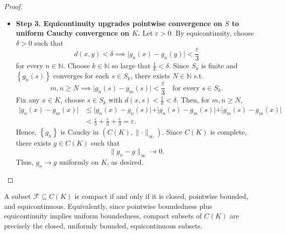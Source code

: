 \begin{proof}
\begin{itemize}
        \item \textbf{Step 3. Equicontinuity upgrades pointwise convergence on \(S\) to uniform Cauchy convergence on \(K\).} Let \(\varepsilon > 0\). By equicontinuity, choose \(\delta > 0\) such that 
        \[
            d(x, y) < \delta \implies \vert g_n(x) - g_n(y) \vert < \frac{\varepsilon}{3} 
        \]
        for every \(n \in \mathbb{N}\). Choose \(k \in \mathbb{N}\) so large that \(\frac{1}{k} < \delta\). Since \(S_k\) is finite and \(\left\{ g_n(s) \right\} \) converges for each \(s \in S_k\), there exists \(N \in \mathbb{N}\) s.t. 
        \[
            m, n \ge N \implies \vert g_n(s) - g_m(s) \vert < \frac{\varepsilon}{3} \quad \text{for every } s \in S_k.  
        \]       
        Fix any \(x \in K\), choose \(s \in S_k\) with \(d(x, s) < \frac{1}{k} < \delta\). Then, for \(m, n \ge N\),
        \begin{align*}
            \vert g_n(x) - g_m(x) \vert &\le \vert g_n(x) - g_n(s)  \vert + \vert g_n(s) - g_m(s) \vert + \vert g_m(s) - g_m(x) \vert \\
            &< \frac{\varepsilon}{3} + \frac{\varepsilon}{3} + \frac{\varepsilon}{3} = \varepsilon.    
        \end{align*}    
        Hence, \(\left\{ g_n \right\} \) is Cauchy in \(\left( C(K), \lVert \cdot \rVert_{\infty }  \right) \). Since \(C(K)\) is complete, there exists \(g \in C(K)\) such that 
        \[
            \lVert g_n - g \rVert_{\infty} \to 0.  
        \]    
        Thus, \(g_n \to g\) uniformly on \(K\), as desired.  
    \end{itemize}
\end{proof}

\begin{corollary} \label{cl: compactness criterion in C(K)}
    A subset \(\mathcal{F} \subseteq C(K)\) is compact if and only if it is closed, pointwise bounded, and equicontinuous. Equivalently, since pointwise boundedness plus equicontinuity implies uniform boundedness, compact subsets of \(C(K)\) are precisely the closed, uniformly bounded, equicontinuous subsets.  
\end{corollary}

